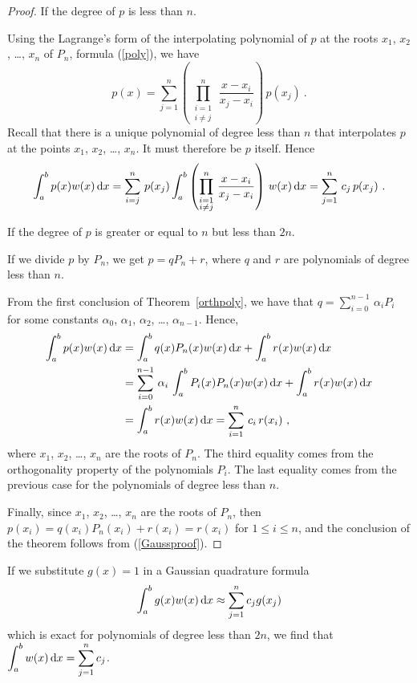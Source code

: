 \begin{proof}
 If the degree of $p$ is less than $n$.

Using the Lagrange's form of the interpolating polynomial of $p$ at
the roots $x_1$, $x_2$, \ldots, $x_n$ of $P_n$, formula (\ref{poly}),
we have
\[
p(x) = \sum_{j=1}^n \left( \prod_{\substack{i=1\\i\not=j}}^n
 \,\frac{x-x_i}{x_j-x_i}\right)\,p(x_j) \ .
\]
Recall that there is a unique polynomial of degree less than $n$ that
interpolates $p$ at the points $x_1$, $x_2$, \ldots, $x_n$.  It must
therefore be $p$ itself.  Hence
\[
\int_a^b p(x)w(x) \,\mathrm{d}x
= \sum_{i=j}^n \,p(x_j) \int_a^b \left(
\prod_{\substack{i=1\\i\not=j}}^n \,\frac{x-x_i}{x_j-x_i} \right)\,w(x) \,\mathrm{d}x
= \sum_{j=1}^n \,c_j \,p(x_j) \ .
\]

 If the degree of $p$ is greater or equal to $n$ but less
than $2n$.

If we divide $p$ by $P_n$, we get $p = q P_n + r$, where $q$ and $r$
are polynomials of degree less than $n$.

From the first conclusion of Theorem~\ref{orthpoly}, we have that
$\displaystyle q= \sum_{i=0}^{n-1} \, \alpha_i P_i$ for some constants
$\alpha_0$, $\alpha_1$, $\alpha_2$, \ldots, $\alpha_{n-1}$.  Hence,
\begin{align}
\int_a^b p(x)w(x) \,\mathrm{d}x &= \int_a^b q(x)P_n(x)w(x)\,\mathrm{d}x +
\int_a^b r(x)w(x)\,\mathrm{d}x \nonumber \\
&= \sum_{i=0}^{n-1}\,\alpha_i \,\int_a^b P_i(x)P_n(x)w(x)\,\mathrm{d}x +
\int_a^b r(x)w(x)\,\mathrm{d}x \nonumber \\
&= \int_a^b r(x)w(x)\,\mathrm{d}x
= \sum_{i=1}^n \,c_i\,r(x_i) \ , \label{Gaussproof}
\end{align}
where $x_1$, $x_2$, \ldots, $x_n$ are the roots of $P_n$.  The third
equality comes from the orthogonality property of the polynomials
$P_i$.  The last equality comes from the previous case for the
polynomials of degree less than $n$.

Finally, since $x_1$, $x_2$, \ldots, $x_n$ are the roots of $P_n$,
then $p(x_i) = q(x_i)P_n(x_i) + r(x_i) = r(x_i)$ for $1\leq i \leq n$,
and the conclusion of the theorem follows from (\ref{Gaussproof}).
\end{proof}

\begin{rmk}
If we substitute $g(x) = 1$ in a Gaussian quadrature formula
\[
\int_a^b g(x) w(x)\,\mathrm{d}x \approx \sum_{j=1}^n c_j g(x_j)
\]
which is exact for polynomials of degree less than $2n$, we find
that
$\displaystyle \int_a^b w(x)\,\mathrm{d}x = \sum_{j=1}^n c_j$.
\label{sumCoeff}
\end{rmk}

